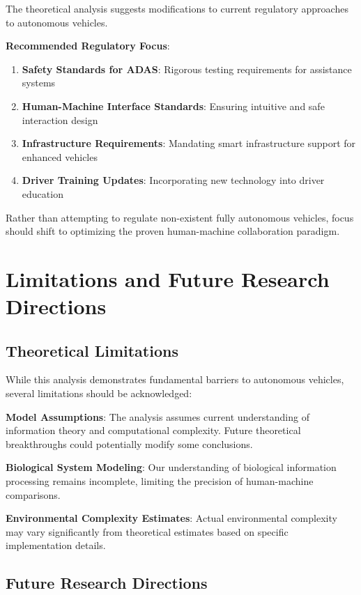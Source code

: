 \documentclass[12pt,a4paper]{article}
\begin{document}
The theoretical analysis suggests modifications to current regulatory approaches to autonomous vehicles.

\textbf{Recommended Regulatory Focus}:
\begin{enumerate}
\item \textbf{Safety Standards for ADAS}: Rigorous testing requirements for assistance systems
\item \textbf{Human-Machine Interface Standards}: Ensuring intuitive and safe interaction design
\item \textbf{Infrastructure Requirements}: Mandating smart infrastructure support for enhanced vehicles
\item \textbf{Driver Training Updates}: Incorporating new technology into driver education
\end{enumerate}

Rather than attempting to regulate non-existent fully autonomous vehicles, focus should shift to optimizing the proven human-machine collaboration paradigm.

\section{Limitations and Future Research Directions}

\subsection{Theoretical Limitations}

While this analysis demonstrates fundamental barriers to autonomous vehicles, several limitations should be acknowledged:

\textbf{Model Assumptions}: The analysis assumes current understanding of information theory and computational complexity. Future theoretical breakthroughs could potentially modify some conclusions.

\textbf{Biological System Modeling}: Our understanding of biological information processing remains incomplete, limiting the precision of human-machine comparisons.

\textbf{Environmental Complexity Estimates}: Actual environmental complexity may vary significantly from theoretical estimates based on specific implementation details.

\subsection{Future Research Directions}
\end{document}

